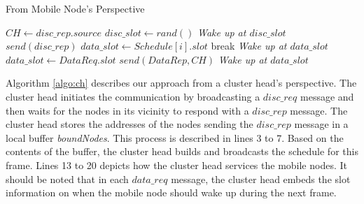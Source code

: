 %
%
%

\begin{algorithm}[H]
	\caption{From Mobile Node's Perspective}
	\label{algo:mob}
\begin{algorithmic}[1]
	\State $CH\gets disc\_rep.source$
	\State $disc\_slot\gets rand()$
	\State \emph{Wake up at $disc\_slot$}
	\State $send(disc\_rep)$
	\State $data\_slot \gets Schedule[i].slot$
	\State break
	\EndIf
	\EndFor
	\State \emph{Wake up at $data\_slot$}
	\State $data\_slot \gets DataReq.slot$
	\State $send(DataRep,CH)$
	\State \emph{Wake up at $data\_slot$}
	\EndWhile
	\EndIf
\EndIf
\EndWhile
\EndProcedure
\end{algorithmic}
\end{algorithm}

Algorithm \ref{algo:ch} describes our approach from a cluster head's perspective. The cluster head initiates the communication by broadcasting a $disc\_req$ message and then waits for the nodes in its vicinity to respond with a $disc\_rep$ message. The cluster head stores the addresses of the nodes sending the $disc\_rep$ message in a local buffer \emph{boundNodes}. This process is described in lines 3 to 7. Based on the contents of the buffer, the cluster head builds and broadcasts the schedule for this frame. Lines 13 to 20 depicts how the cluster head services the mobile nodes. It should be noted that in each $data\_req$ message, the cluster head embeds the slot information on when the mobile node should wake up during the next frame.





